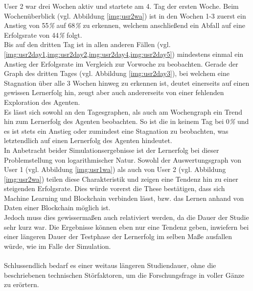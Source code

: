 User 2 war drei Wochen aktiv und startete am 4. Tag der ersten Woche.
Beim Wochenüberblick (vgl. Abbildung \ref{img:usr2wa}) ist in den Wochen 1-3 zuerst ein Anstieg von 55\textit{\%} auf 68\textit{\%} zu erkennen, welchem anschließend ein Abfall auf eine Erfolgsrate von 44\textit{\%} folgt. \\
Bis auf den dritten Tag ist in allen anderen Fällen (vgl. \cref{img:usr2day1,img:usr2day2,img:usr2day4,img:usr2day5})  mindestens einmal ein Anstieg der Erfolgsrate im Vergleich zur Vorwoche zu beobachten. Gerade der Graph des dritten Tages (vgl. Abbildung \ref{img:usr2day3}), bei welchem eine Stagnation über alle 3 Wochen hinweg zu erkennen ist, deutet einerseits auf einen gewissen Lernerfolg hin, zeugt aber auch andererseits von einer fehlenden Exploration des Agenten. \\
Es lässt sich sowohl an den Tagesgraphen, als auch am Wochengraph ein Trend hin zum Lernerfolg des Agenten beobachten. So ist die  in keinem Tag bei 0\textit{\%} und es ist stets ein Anstieg oder zumindest eine Stagnation zu beobachten, was letztendlich auf einen Lernerfolg des Agenten hindeutet.
\\
In Anbetracht beider Simulationsergebnisse ist der Lernerfolg bei dieser Problemstellung von logarithmischer Natur. Sowohl der Auswertungsgraph von User 1 (vgl. Abbildung \ref{img:usr1wa}) als auch von User 2 (vgl. Abbildung \ref{img:usr2wa}) teilen diese Charakteristik und zeigen eine Tendenz hin zu einer steigenden Erfolgsrate. Dies würde vorerst die These bestätigen, dass sich Machine Learning und Blockchain verbinden lässt, bzw. das Lernen anhand von Daten einer Blockchain möglich ist. \\
Jedoch muss dies gewissermaßen auch relativiert werden, da die Dauer der Studie sehr kurz war. Die Ergebnisse können eben nur eine Tendenz geben, inwiefern bei einer längeren Dauer der Testphase der Lernerfolg im selben Maße ausfallen würde, wie im Falle der Simulation. \\\\
Schlussendlich bedarf es einer weitaus längeren Studiendauer, ohne die beschriebenen technischen Störfaktoren, um die Forschungsfrage in voller Gänze zu erörtern. 

